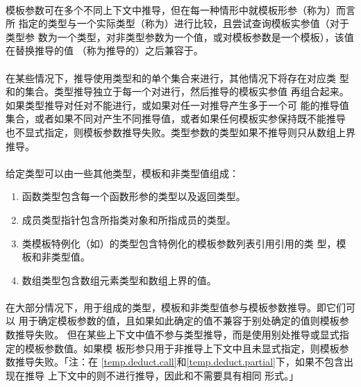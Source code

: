 \paragraph{}
模板参数可在多个不同上下文中推导，但在每一种情形中就模板形参（称为）而言所
指定的类型与一个实际类型（称为）进行比较，且尝试查询模板实参值（对于类型参
数为一个类型，对非类型参数为一个值，或对模板参数是一个模板），该值在替换推导的值
（称为推导的）之后兼容于。

\paragraph{}
在某些情况下，推导使用类型和的单个集合来进行，其他情况下将存在对应类
型和的集合。类型推导独立于每一个对进行，然后推导的模板实参值
再组合起来。如果类型推导对任对不能进行，或如果对任一对推导产生多于一个可
能的推导值集合，或者如果不同对产生不同推导值，或者如果任何模板实参保持既不能推导
也不显式指定，则模板参数推导失败。类型参数的类型如果不推导则只从数组上界推导。

\paragraph{}
给定类型可以由一些其他类型，模板和非类型值组成：
\begin{enumerate}
  \item{函数类型包含每一个函数形参的类型以及返回类型。}
  \item{成员类型指针包含所指类对象和所指成员的类型。}
  \item{类模板特例化（如）的类型包含特例化的模板参数列表引用引用的类
    型，模板和非类型值。}
  \item{数组类型包含数组元素类型和数组上界的值。}
\end{enumerate}

\paragraph{}
在大部分情况下，用于组成的类型，模板和非类型值参与模板参数推导。即它们可以
用于确定模板参数的值，且如果如此确定的值不兼容于别处确定的值则模板参数推导失败。
但在某些上下文中值不参与类型推导，而是使用别处推导或显式指定的模板参数值。如果模
板形参只用于非推导上下文中且未显式指定，则模板参数推导失败。「注：在
\ref{temp.deduct.call}和\ref{temp.deduct.partial}下，如果不包含出现在推导
上下文中的则不进行推导，因此和不需要具有相同
形式。」

